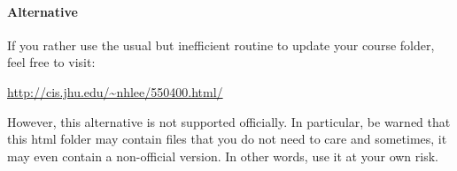 \documentclass[12pt]{article}
\begin{document}
\paragraph{Alternative} 

If you rather use the usual but inefficient routine to update your course
folder, feel free to visit: 
\begin{center}
    \url{http://cis.jhu.edu/~nhlee/550400.html/}
\end{center}
However, this alternative is not supported officially.  In particular, 
be warned that this html folder may contain files that you do not need to care
and sometimes, it may even contain a non-official version. In other words, use it at
your own risk. 
\end{document}
